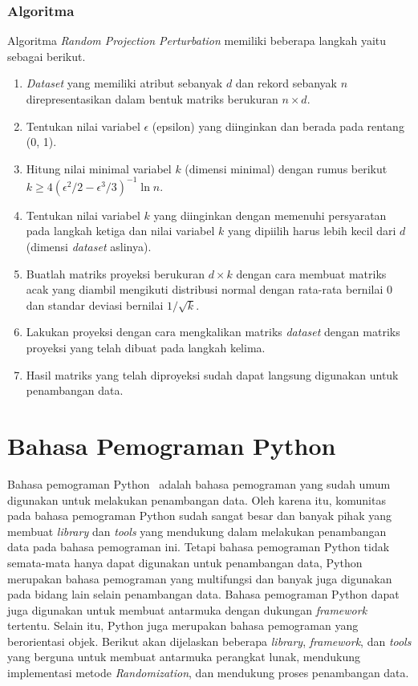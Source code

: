 \subsubsection{Algoritma}
\label{subsubsec:algo-projection}

Algoritma \textit{Random Projection Perturbation} memiliki beberapa langkah yaitu sebagai berikut.
\begin{enumerate}
    \item \textit{Dataset} yang memiliki atribut sebanyak \(d\) dan rekord sebanyak \(n\) direpresentasikan dalam bentuk matriks berukuran \(n \times d\).
    \item Tentukan nilai variabel \(\epsilon\) (epsilon) yang diinginkan dan berada pada rentang (0, 1).
    \item Hitung nilai minimal variabel \(k\) (dimensi minimal) dengan rumus berikut \(k \geq 4(\epsilon^{2}/2-\epsilon^{3}/3)^{-1}\ln{n}\).
    \item Tentukan nilai variabel \(k\) yang diinginkan dengan memenuhi persyaratan pada langkah ketiga dan nilai variabel \(k\) yang dipiilih harus lebih kecil dari \(d\) (dimensi \textit{dataset} aslinya).
    \item Buatlah matriks proyeksi berukuran \(d \times k\) dengan cara membuat matriks acak yang diambil mengikuti distribusi normal dengan rata-rata bernilai 0 dan standar deviasi bernilai \(1/\sqrt{k}\).
    \item Lakukan proyeksi dengan cara mengkalikan matriks \textit{dataset} dengan matriks proyeksi yang telah dibuat pada langkah kelima.
    \item Hasil matriks yang telah diproyeksi sudah dapat langsung digunakan untuk penambangan data.
\end{enumerate}

\section{Bahasa Pemograman Python}
\label{sec:python}

Bahasa pemograman Python~\cite{python:95:guido} adalah bahasa pemograman yang sudah umum digunakan untuk melakukan penambangan data. Oleh karena itu, komunitas pada bahasa pemograman Python sudah sangat besar dan banyak pihak yang membuat \textit{library} dan \textit{tools} yang mendukung dalam melakukan penambangan data pada bahasa pemograman ini. Tetapi bahasa pemograman Python tidak semata-mata hanya dapat digunakan untuk penambangan data, Python merupakan bahasa pemograman yang multifungsi dan banyak juga digunakan pada bidang lain selain penambangan data. Bahasa pemograman Python dapat juga digunakan untuk membuat antarmuka dengan dukungan \textit{framework} tertentu. Selain itu, Python juga merupakan bahasa pemograman yang berorientasi objek. Berikut akan dijelaskan beberapa \textit{library}, \textit{framework}, dan \textit{tools} yang berguna untuk membuat antarmuka perangkat lunak, mendukung implementasi metode \textit{Randomization}, dan mendukung proses penambangan data.

